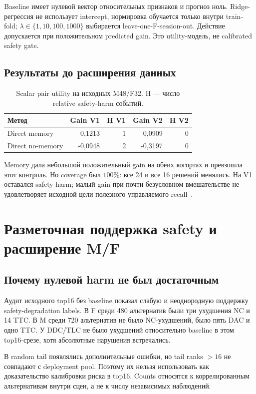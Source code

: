 \documentclass[11pt,a4paper]{article}
\begin{document}
Baseline имеет нулевой вектор относительных признаков и прогноз ноль. Ridge-регрессия не использует intercept, нормировка обучается только внутри train-fold; $\lambda\in\{1,10,100,1000\}$ выбирается leave-one-F-session-out. Действие допускается при положительном predicted gain. Это utility-модель, не calibrated safety gate.

\subsection{Результаты до расширения данных}
\par
\begin{table}[htbp]\centering\small
\caption{Scalar pair utility на исходных M48/F32. H --- число relative safety-harm событий.}
\begin{tabular}{@{}lrrrr@{}}\toprule
Метод & Gain V1 & H V1 & Gain V2 & H V2\\\midrule
Direct memory & 0,1213 & 1 & 0,0909 & 0\\
Direct no-memory & -0,0948 & 2 & -0,3197 & 0\\\bottomrule
\end{tabular}
\end{table}
\par
Memory дала небольшой положительный gain на обеих когортах и превзошла этот контроль. Но coverage был $100\%$: все 24 и все 16 решений менялись. На V1 оставался safety-harm; малый gain при почти безусловном вмешательстве не удовлетворяет исходной цели полезного управляемого recall~\cite{pair}.

\section{Разметочная поддержка safety и расширение M/F}
\subsection{Почему нулевой harm не был достаточным}
Аудит исходного top16 без baseline показал слабую и неоднородную поддержку safety-degradation labels. В F среди 480 альтернатив были три ухудшения NC и 14 TTC. В M среди 720 альтернатив не было NC-ухудшений, было пять DAC и одно TTC. У DDC/TLC не было ухудшений относительно baseline в этом top16-срезе, хотя абсолютные нарушения встречались.

В random tail появлялись дополнительные ошибки, но tail ranks $>16$ не совпадают с deployment pool. Поэтому их нельзя использовать как доказательство калибровки риска в top16. Counts относятся к коррелированным альтернативам внутри сцен, а не к числу независимых наблюдений.
\end{document}
